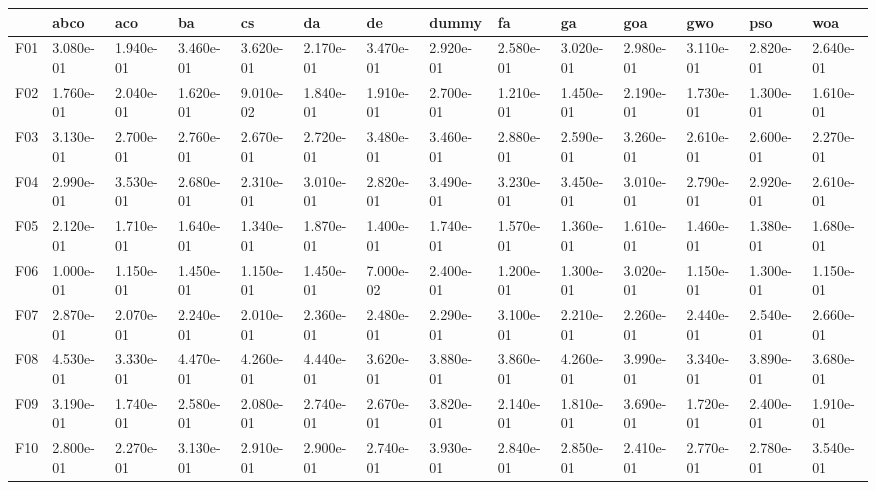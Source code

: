 \begin{table}
    \begin{adjustbox}{width=\linewidth}
        \begin{tabular}{llllllllllllll}
            \toprule
            {}   & abco      & aco       & ba        & cs        & da        & de        & dummy     & fa        & ga        & goa       & gwo       & pso       & woa       \\
            \midrule
            F01  & 3.080e-01 & 1.940e-01 & 3.460e-01 & 3.620e-01 & 2.170e-01 & 3.470e-01 & 2.920e-01 & 2.580e-01 & 3.020e-01 & 2.980e-01 & 3.110e-01 & 2.820e-01 & 2.640e-01 \\
            F02  & 1.760e-01 & 2.040e-01 & 1.620e-01 & 9.010e-02 & 1.840e-01 & 1.910e-01 & 2.700e-01 & 1.210e-01 & 1.450e-01 & 2.190e-01 & 1.730e-01 & 1.300e-01 & 1.610e-01 \\
            F03  & 3.130e-01 & 2.700e-01 & 2.760e-01 & 2.670e-01 & 2.720e-01 & 3.480e-01 & 3.460e-01 & 2.880e-01 & 2.590e-01 & 3.260e-01 & 2.610e-01 & 2.600e-01 & 2.270e-01 \\
            F04  & 2.990e-01 & 3.530e-01 & 2.680e-01 & 2.310e-01 & 3.010e-01 & 2.820e-01 & 3.490e-01 & 3.230e-01 & 3.450e-01 & 3.010e-01 & 2.790e-01 & 2.920e-01 & 2.610e-01 \\
            F05  & 2.120e-01 & 1.710e-01 & 1.640e-01 & 1.340e-01 & 1.870e-01 & 1.400e-01 & 1.740e-01 & 1.570e-01 & 1.360e-01 & 1.610e-01 & 1.460e-01 & 1.380e-01 & 1.680e-01 \\
            F06  & 1.000e-01 & 1.150e-01 & 1.450e-01 & 1.150e-01 & 1.450e-01 & 7.000e-02 & 2.400e-01 & 1.200e-01 & 1.300e-01 & 3.020e-01 & 1.150e-01 & 1.300e-01 & 1.150e-01 \\
            F07  & 2.870e-01 & 2.070e-01 & 2.240e-01 & 2.010e-01 & 2.360e-01 & 2.480e-01 & 2.290e-01 & 3.100e-01 & 2.210e-01 & 2.260e-01 & 2.440e-01 & 2.540e-01 & 2.660e-01 \\
            F08  & 4.530e-01 & 3.330e-01 & 4.470e-01 & 4.260e-01 & 4.440e-01 & 3.620e-01 & 3.880e-01 & 3.860e-01 & 4.260e-01 & 3.990e-01 & 3.340e-01 & 3.890e-01 & 3.680e-01 \\
            F09  & 3.190e-01 & 1.740e-01 & 2.580e-01 & 2.080e-01 & 2.740e-01 & 2.670e-01 & 3.820e-01 & 2.140e-01 & 1.810e-01 & 3.690e-01 & 1.720e-01 & 2.400e-01 & 1.910e-01 \\
            F10  & 2.800e-01 & 2.270e-01 & 3.130e-01 & 2.910e-01 & 2.900e-01 & 2.740e-01 & 3.930e-01 & 2.840e-01 & 2.850e-01 & 2.410e-01 & 2.770e-01 & 2.780e-01 & 3.540e-01 \\

\end{tabular}
\end{adjustbox}
\end{table}
